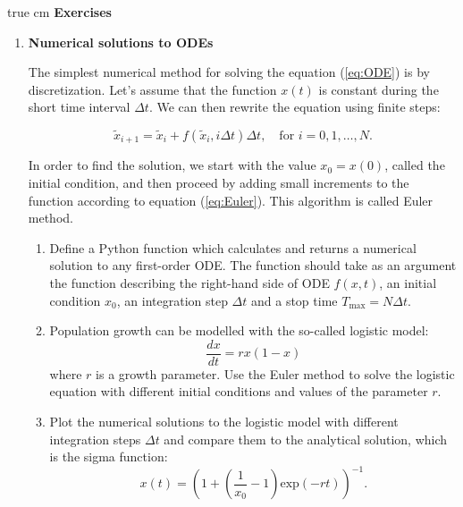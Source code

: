 \documentclass[12pt, a4]{article}
\begin{document}
 true cm
{\bf Exercises}
\begin{enumerate}

\item \textbf{Numerical solutions to ODEs} 

    The simplest numerical method for solving the equation (\ref{eq:ODE})
    is by discretization. Let's assume that the function $x(t)$ is constant
    during the short time interval $\Delta t$. We can then rewrite the equation
    using finite steps:

    \begin{equation}
        \tilde{x}_{i+1} =\tilde{x}_i + f(\tilde{x}_i, i\Delta t)\Delta t,
        \quad \text{for } i=0,1,\dots,N.
        \label{eq:Euler}
    \end{equation} 

    In order to find the solution, we start with the value $x_0=x(0)$,
    called the initial condition, and then proceed by adding
    small increments to the function according to equation
    (\ref{eq:Euler}). This algorithm is called Euler method.

    \begin{enumerate}
        \item Define a Python function which calculates and returns a
        numerical solution to any first-order ODE. The function should
        take as an argument the function describing the right-hand side
        of ODE $f(x,t)$, an initial condition $x_0$, an integration step
        $\Delta t$ and a stop time $T_\mathrm{max}=N\Delta t$.
     
        \item Population growth can be modelled with the so-called logistic
        model: \begin{equation} \frac{dx}{dt}=rx(1-x) \label{eq:logistic}
        \end{equation} where $r$ is a growth parameter. Use the Euler
        method to solve the logistic equation with different
        initial conditions and values of the parameter $r$.

        \item Plot the numerical solutions to the logistic model with
        different integration steps $\Delta t$ and compare them to the
        analytical solution, which is the sigma function:
        \begin{equation}
            x(t) = \left(1 + \left( \frac{1}{x_0} - 1 \right)
                \mathrm{exp}(-rt)\right)^{-1}.
        \end{equation}


\end{enumerate}
\end{enumerate}
\end{document}
